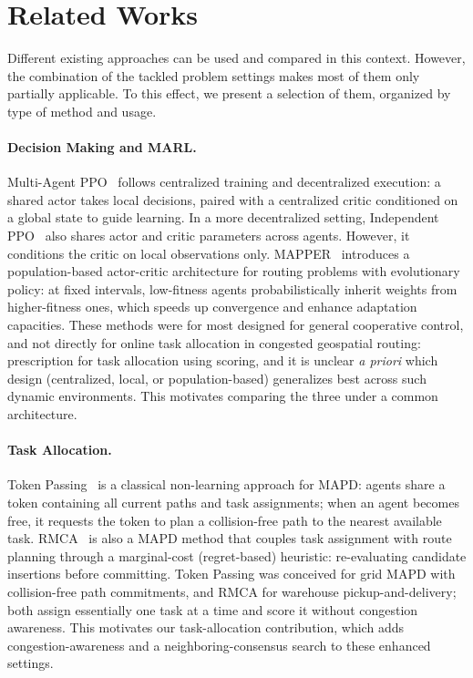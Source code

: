 \documentclass[sigconf]{acmart}
\begin{document}
\section{Related Works}
\label{sec:related_works}

Different existing approaches can be used and compared in this context. However, the combination of the tackled problem settings makes most of them only partially applicable. To this effect, we present a selection of them, organized by type of method and usage.

\paragraph{Decision Making and MARL.}
Multi-Agent PPO~\cite{yu2022} follows centralized training and decentralized execution: a shared actor takes local decisions, paired with a centralized critic conditioned on a global state to guide learning. In a more decentralized setting, Independent PPO~\cite{dewitt2020} also shares actor and critic parameters across agents. However, it conditions the critic on local observations only. MAPPER~\cite{liu2020} introduces a population-based actor-critic architecture for routing problems with evolutionary policy: at fixed intervals, low-fitness agents probabilistically inherit weights from higher-fitness ones, which speeds up convergence and enhance adaptation capacities. These methods were for most designed for general cooperative control, and not directly for online task allocation in congested geospatial routing: prescription for task allocation using scoring, and it is unclear \emph{a priori} which design (centralized, local, or population-based) generalizes best across such dynamic environments. This motivates comparing the three under a common architecture.

\paragraph{Task Allocation.}
Token Passing~\cite{ma2017} is a classical non-learning approach for MAPD: agents share a token containing all current paths and task assignments; when an agent becomes free, it requests the token to plan a collision-free path to the nearest available task. RMCA~\cite{chen2021} is also a MAPD method that couples task assignment with route planning through a marginal-cost (regret-based) heuristic: re-evaluating candidate insertions before committing. Token Passing was conceived for grid MAPD with collision-free path commitments, and RMCA for warehouse pickup-and-delivery; both assign essentially one task at a time and score it without congestion awareness. This motivates our task-allocation contribution, which adds congestion-awareness and a neighboring-consensus search to these enhanced settings.
\end{document}
